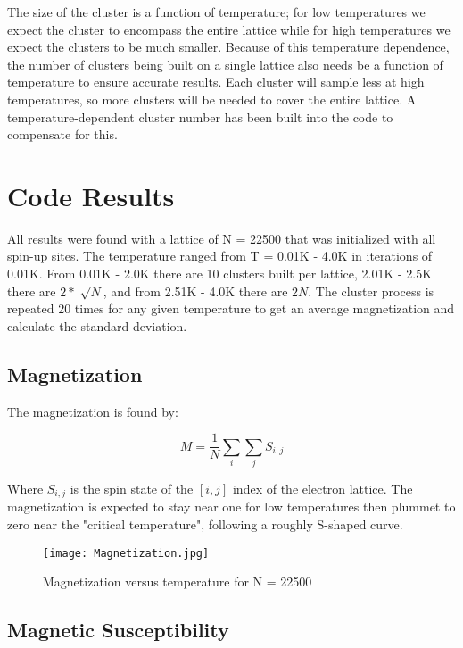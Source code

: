 \documentclass[10pt,letterpaper]{article}
\begin{document}
The size of the cluster is a function of temperature; for low temperatures we expect the cluster to encompass the entire lattice while for high temperatures we expect the clusters to be much smaller. Because of this temperature dependence, the number of clusters being built on a single lattice also needs be a function of temperature to ensure accurate results. Each cluster will sample less at high temperatures, so more clusters will be needed to cover the entire lattice. A temperature-dependent cluster number has been built into the code to compensate for this.



\section{Code Results}

All results were found with a lattice of N = 22500 that was initialized with all spin-up sites. The temperature ranged from T = 0.01K - 4.0K in iterations of 0.01K. From 0.01K - 2.0K there are 10 clusters built per lattice, 2.01K - 2.5K there are $2*\sqrt[]{N}$, and from 2.51K - 4.0K there are $2N$. The cluster process is repeated 20 times for any given temperature to get an average magnetization and calculate the standard deviation.

\subsection{Magnetization}

The magnetization is found by:

\begin{equation}
M = \frac{1}{N} \sum_{i}\sum_{j}{S_{i,j}}
\end{equation}

Where $S_{i,j}$ is the spin state of the $[i,j]$ index of the electron lattice. The magnetization is expected to stay near one for low temperatures then plummet to zero near the "critical temperature", following a roughly S-shaped curve.

\begin{figure}[H]
\centering
\texttt{[image: Magnetization.jpg]}
\caption{Magnetization versus temperature for N = 22500}
\end{figure}

\pagebreak

\subsection{Magnetic Susceptibility}
\end{document}
